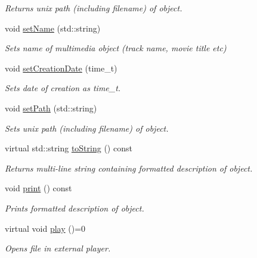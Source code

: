 \begin{DoxyCompactItemize}
\begin{DoxyCompactList}\small\item\em Returns unix path (including filename) of object. \end{DoxyCompactList}\item 
\hypertarget{classBaseObject_a3999488d0dd4e825641ece8f332385e1}{void \hyperlink{classBaseObject_a3999488d0dd4e825641ece8f332385e1}{set\-Name} (std\-::string)}\label{classBaseObject_a3999488d0dd4e825641ece8f332385e1}

\begin{DoxyCompactList}\small\item\em Sets name of multimedia object (track name, movie title etc) \end{DoxyCompactList}\item 
\hypertarget{classBaseObject_aeeb327051d61bd727722f583fa0bc41c}{void \hyperlink{classBaseObject_aeeb327051d61bd727722f583fa0bc41c}{set\-Creation\-Date} (time\-\_\-t)}\label{classBaseObject_aeeb327051d61bd727722f583fa0bc41c}

\begin{DoxyCompactList}\small\item\em Sets date of creation as time\-\_\-t. \end{DoxyCompactList}\item 
\hypertarget{classBaseObject_a06461859fe33fc77fee0b74dbbe1b57d}{void \hyperlink{classBaseObject_a06461859fe33fc77fee0b74dbbe1b57d}{set\-Path} (std\-::string)}\label{classBaseObject_a06461859fe33fc77fee0b74dbbe1b57d}

\begin{DoxyCompactList}\small\item\em Sets unix path (including filename) of object. \end{DoxyCompactList}\item 
\hypertarget{classBaseObject_aab08eee6684fdfa0852b1f914379b9c4}{virtual std\-::string \hyperlink{classBaseObject_aab08eee6684fdfa0852b1f914379b9c4}{to\-String} () const }\label{classBaseObject_aab08eee6684fdfa0852b1f914379b9c4}

\begin{DoxyCompactList}\small\item\em Returns multi-\/line string containing formatted description of object. \end{DoxyCompactList}\item 
void \hyperlink{classBaseObject_a9bad65dddde7dec1ea622edce664cc9f}{print} () const 
\begin{DoxyCompactList}\small\item\em Prints formatted description of object. \end{DoxyCompactList}\item 
\hypertarget{classBaseObject_a63e43537301807233867a3b61052f5a6}{virtual void \hyperlink{classBaseObject_a63e43537301807233867a3b61052f5a6}{play} ()=0}\label{classBaseObject_a63e43537301807233867a3b61052f5a6}

\begin{DoxyCompactList}\small\item\em Opens file in external player. \end{DoxyCompactList}\end{DoxyCompactItemize}


